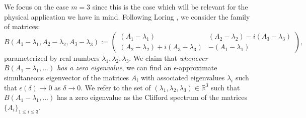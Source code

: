\documentclass[a4paper]{article}
\begin{document}
We focus on the case $m = 3$ since this is the case which will be relevant for the physical application we have in mind. Following Loring \cite{2015Loring}, we consider the family of matrices: 
\begin{equation} \label{eq:B_matrix}
	B(A_1 - \lambda_1,A_2 - \lambda_2,A_3 - \lambda_3) := \begin{pmatrix} (A_1 - \lambda_1) & (A_2 - \lambda_2) - i (A_3 - \lambda_3) \\ (A_2 - \lambda_2) + i (A_3 - \lambda_3) & - (A_1 - \lambda_1) \end{pmatrix},
\end{equation}
parameterized by real numbers $\lambda_1, \lambda_2, \lambda_3$. We claim that \emph{whenever $B(A_1-\lambda_1,...)$ has a zero eigenvalue}, we can find an $\epsilon$-approximate simultaneous eigenvector of the matrices $A_i$ with associated eigenvalues $\lambda_i$ such that $\epsilon(\delta) \rightarrow 0$ as $\delta \rightarrow 0$. We refer to the set of $(\lambda_1,\lambda_2,\lambda_3) \in \mathbb{R}^3$ such that $B(A_1 - \lambda_1,...)$ has a zero eigenvalue as the {Clifford spectrum} of the matrices $\{ A_i \}_{1 \leq i \leq 3}$.
\end{document}
